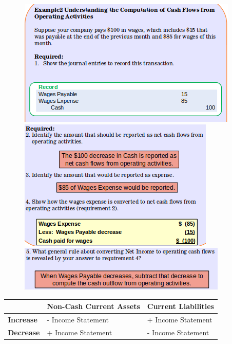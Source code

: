 \documentclass[../main.tex]{subfiles}
\begin{document}
	\begin{figure}[ht!]
		\centering
		\includegraphics[width=0.9\columnwidth]{images/c11/cash_flows_eg2_p1.png}
		\includegraphics[width=0.85\columnwidth]{images/c11/cash_flows_eg2_p2.png}
		\includegraphics[width=0.85\columnwidth]{images/c11/cash_flows_eg2_p3.png}
	\end{figure}
	\begin{table}[ht!]
		\begin{tabular}{|p{}|p{}|p{}|}
			\hline
			& \textbf{Non-Cash Current Assets} & \textbf{Current Liabilities} \\
			\hline
			\textbf{Increase} & - Income Statement & + Income Statement \\ 
			\hline
			\textbf{Decrease} & + Income Statement & - Income Statement \\
			\hline
		\end{tabular}
	\end{table}
\end{document}
